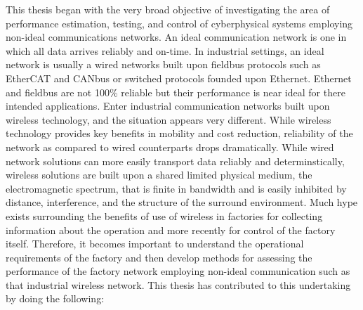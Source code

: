 This thesis began with the very broad objective of investigating the area of performance estimation, testing, and control of cyberphysical systems employing non-ideal communications networks.  An ideal communication network is one in which all data arrives reliably and on-time.  In industrial settings, an ideal network is usually a wired networks built upon fieldbus protocols such as EtherCAT and CANbus or switched protocols founded upon Ethernet.  Ethernet and fieldbus are not 100\% reliable but their performance is near ideal for there intended applications.  Enter industrial communication networks built upon wireless technology, and the situation appears very different.  While wireless technology provides key benefits in mobility and cost reduction, reliability of the network as compared to wired counterparts drops dramatically.  While wired network solutions can more easily transport data reliably and determinstically, wireless solutions are built upon a shared limited physical medium, the electromagnetic spectrum, that is finite in bandwidth and is easily inhibited by distance, interference, and the structure of the surround environment.  Much hype exists surrounding the benefits of use of wireless in factories for collecting information about the operation and more recently for control of the factory itself.  Therefore, it becomes important to understand the operational requirements of the factory and then develop methods for assessing the performance of the factory network employing non-ideal communication such as that industrial wireless network.  This thesis has contributed to this undertaking by doing the following:

